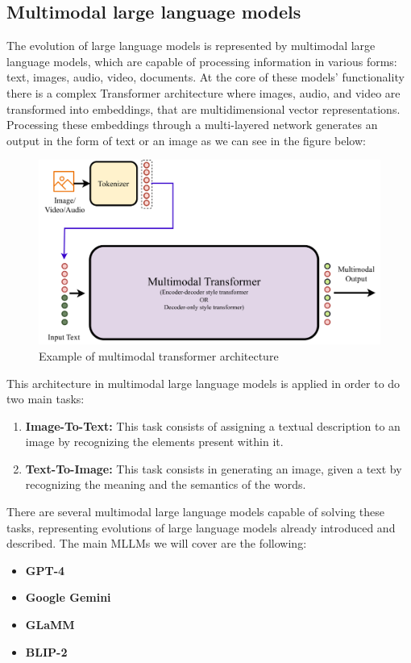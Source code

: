\newpage
\subsection{Multimodal large language models}
The evolution of large language models is represented by multimodal large language models, which are capable of processing information in various forms: text, images, audio, video, documents. At the core of these models’ functionality there is a complex Transformer architecture where images, audio, and video are transformed into embeddings, that are multidimensional vector representations. Processing these embeddings through a multi-layered network generates an output in the form of text or an image\cite{wadekar2024evolution} as we can see in the figure below: 
\begin{figure}[H]
    \centering
    \includegraphics[width=0.9\linewidth]{Figures/fig_21.png}
    \caption{Example of multimodal transformer architecture}
    \label{fig:enter-label}
\end{figure}
This architecture in multimodal large language models is applied in order to do two main tasks:
\begin{enumerate}
    \item \textbf{Image-To-Text:} This task consists of assigning a textual description to an image by recognizing the elements present within it.


    \item \textbf{Text-To-Image:} This task consists in generating an image, given a text by recognizing the meaning and the semantics of the words.
\end{enumerate}
There are several multimodal large language models capable of solving these tasks, representing evolutions of large language models already introduced and described. The main MLLMs we will cover are the following:

\begin{itemize}
    \item \textbf{GPT-4}

    \item \textbf{Google Gemini} 

    \item \textbf{GLaMM}

    \item \textbf{BLIP-2}
\end{itemize}

